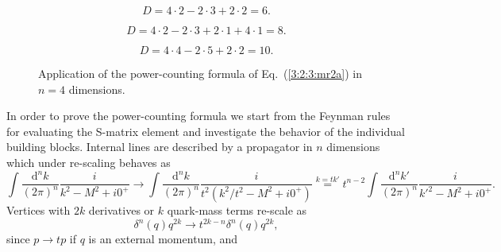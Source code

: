 \documentclass[twoside,12pt]{article}
\begin{document}
\begin{figure}[t]
\begin{minipage}[t]{0.25\textwidth}
\begin{center}
\end{center}
\begin{displaymath}
D=4\cdot 2-2\cdot 3+2\cdot 2=6.
\end{displaymath}
\end{minipage}
\hspace{0.1\textwidth}
\begin{minipage}[t]{0.25\textwidth}
\begin{center}
\end{center}
\begin{displaymath}
D=4\cdot 2-2\cdot 3+2\cdot 1 +4 \cdot 1=8.
\end{displaymath}
\end{minipage}
\hspace{0.1\textwidth}
\begin{minipage}[t]{0.25\textwidth}
\begin{center}
\end{center}
\begin{displaymath}
D=4\cdot 4 -2\cdot 5+2\cdot 2 = 10.
\end{displaymath}
\end{minipage}
\caption{\label{3:2:3:figure:power_counting} Application of the
power-counting formula of Eq.~(\ref{3:2:3:mr2a}) in
$n=4$ dimensions.}
\end{figure}
   In order to prove the power-counting formula we start from the
Feynman rules for evaluating the S-matrix element and investigate the
behavior of the individual building blocks.
   Internal lines are described by a propagator in $n$ dimensions
which under re-scaling behaves as
\begin{displaymath}
\int \frac{\mbox{d}^n k}{(2\pi)^n} \frac{i}{k^2-M^2+i0^+}
\to \int \frac{\mbox{d}^n k}{(2\pi)^n}
\frac{i}{t^2(k^2/t^2-M^2+i0^+)}
\stackrel{\mbox{$k=tk'$}}{=}t^{n-2}
\int \frac{\mbox{d}^n k'}{(2\pi)^n} \frac{i}{k'^2-M^2+i0^+}.
\end{displaymath}
   Vertices with $2k$ derivatives or $k$ quark-mass terms re-scale as
\begin{displaymath}
\delta^n(q) q^{2k}\to t^{2k-n}\delta^n(q) q^{2k},
\end{displaymath}
since $p\to tp$ if $q$ is an external momentum,  and
\end{document}
